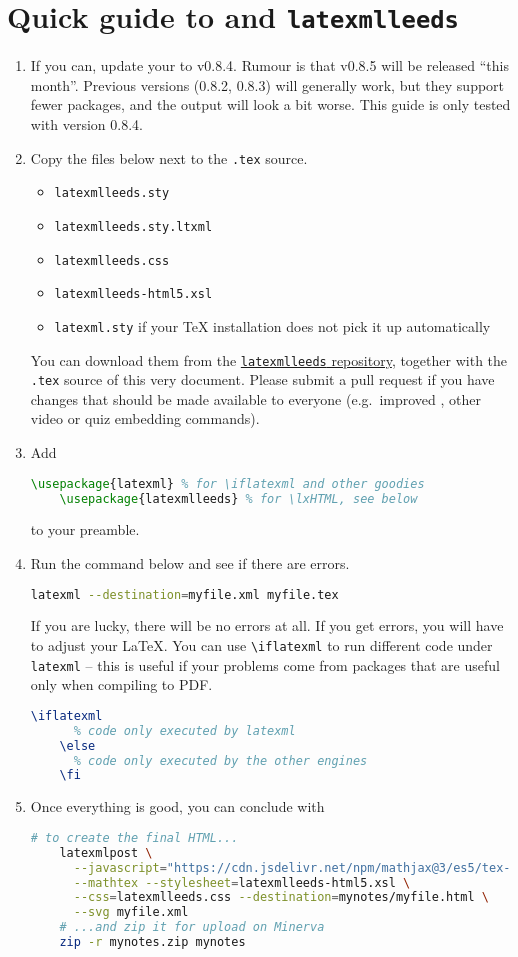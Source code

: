 \documentclass[a4paper]{article}
\theoremstyle{definition}
\begin{document}
\section{Quick guide to \texorpdfstring{\LaTeXML{}}{LaTeXML} and \texttt{latexmlleeds}}
\begin{enumerate}
  \item If you can, update your \LaTeXML{} to v0.8.4. Rumour is that v0.8.5 will be released ``this month''. Previous versions (0.8.2, 0.8.3) will generally work, but they support fewer packages, and the output will look a bit worse. This guide is only tested with version 0.8.4.
  \item Copy the files below next to the \verb|.tex| source.
  \begin{itemize}
    \item \verb|latexmlleeds.sty|
    \item \verb|latexmlleeds.sty.ltxml|
    \item \verb|latexmlleeds.css|
    \item \verb|latexmlleeds-html5.xsl|
    \item \verb|latexml.sty| if your \TeX{} installation does not pick it up automatically
  \end{itemize}
  You can download them from the \href{https://dev.azure.com/pmtvlm-leeds-ac-uk/public/_git/latexmlleeds}{\texttt{latexmlleeds} repository}, together with the \verb|.tex| source of this very document. Please submit a pull request if you have changes that should be made available to everyone (e.g.\ improved \CSS{}, other video or quiz embedding commands).
  \item Add
  \begin{lstlisting}[language=TeX]
    \usepackage{latexml} % for \iflatexml and other goodies
    \usepackage{latexmlleeds} % for \lxHTML, see below
  \end{lstlisting}
  to your preamble.
  \item Run the command below and see if there are errors.
  \begin{lstlisting}[language=bash]
    latexml --destination=myfile.xml myfile.tex
  \end{lstlisting}
  If you are lucky, there will be no errors at all. If you get errors, you will have to adjust your \LaTeX{}. You can use \verb|\iflatexml| to run different code under \verb|latexml| -- this is useful if your problems come from packages that are useful only when compiling to PDF.
  \begin{lstlisting}[language=TeX]
    \iflatexml
      % code only executed by latexml
    \else
      % code only executed by the other engines
    \fi
  \end{lstlisting}
  \item Once everything is good, you can conclude with
  \begin{lstlisting}[language=bash]
    # to create the final HTML...
    latexmlpost \
      --javascript="https://cdn.jsdelivr.net/npm/mathjax@3/es5/tex-mml-chtml.js"\
      --mathtex --stylesheet=latexmlleeds-html5.xsl \
      --css=latexmlleeds.css --destination=mynotes/myfile.html \
      --svg myfile.xml
    # ...and zip it for upload on Minerva
    zip -r mynotes.zip mynotes


\end{lstlisting}
\end{enumerate}
\end{document}
